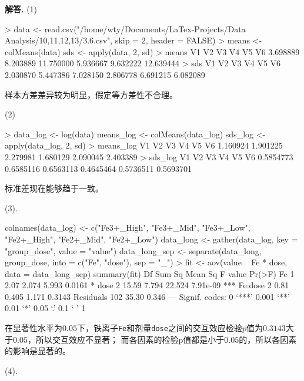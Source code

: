 \documentclass[12pt, a4paper, oneside]{ctexart}
\newenvironment{solution}[1][]{\par\noindent\textbf{#1解答. }}{\smallskip\par}  %
\begin{document}
\begin{solution}
    (1)\begin{rcode}
> data <- read.csv("/home/wty/Documents/LaTex-Projects/Data Analysis/10,11,12,13/3.6.csv", skip = 2, header = FALSE)
> means <- colMeans(data)                                                                                           
sds <- apply(data, 2, sd)
> means
       V1        V2        V3        V4        V5        V6 
 3.698889  8.203889 11.750000  5.936667  9.632222 12.639444 
> sds
      V1       V2       V3       V4       V5       V6 
2.030870 5.447386 7.028150 2.806778 6.691215 6.082089 
    \end{rcode}
    样本方差差异较为明显，假定等方差性不合理。

    (2) \begin{rcode}
> data_log <- log(data)
means_log <- colMeans(data_log)
sds_log <- apply(data_log, 2, sd)
> means_log
        V1       V2       V3       V4       V5       V6 
1.160924 1.901225 2.279981 1.680129 2.090045 2.403389 
> sds_log
        V1        V2        V3        V4        V5        V6 
0.5854773 0.6585116 0.6563113 0.4645464 0.5736511 0.5693701 
    \end{rcode}
    标准差现在能够趋于一致。

    (3). \begin{rcode}
colnames(data_log) <- c("Fe3+_High", "Fe3+_Mid", "Fe3+_Low", "Fe2+_High", "Fe2+_Mid", "Fe2+_Low")
data_long <- gather(data_log, key = "group_dose", value = "value")
data_long_sep <- separate(data_long, group_dose, into = c("Fe", "dose"), sep = "_")
> fit <- aov(value ~ Fe * dose, data = data_long_sep)
summary(fit)
                Df Sum Sq Mean Sq F value   Pr(>F)    
Fe            1   2.07   2.074   5.993   0.0161 *  
dose          2  15.59   7.794  22.524 7.91e-09 ***
Fe:dose       2   0.81   0.405   1.171   0.3143    
Residuals   102  35.30   0.346                     
---
Signif. codes:  0 ‘***’ 0.001 ‘**’ 0.01 ‘*’ 0.05 ‘.’ 0.1 ‘ ’ 1
    \end{rcode}
    在显著性水平为$0.05$下，铁离子\texttt{Fe}和剂量\texttt{dose}之间的交互效应检验$p$值为$0.3143$大于$0.05$，所以交互效应不显著；
    而各因素的检验p值都是小于$0.05$的，所以各因素的影响是显著的。

    (4). 
\end{solution}
\end{document}
